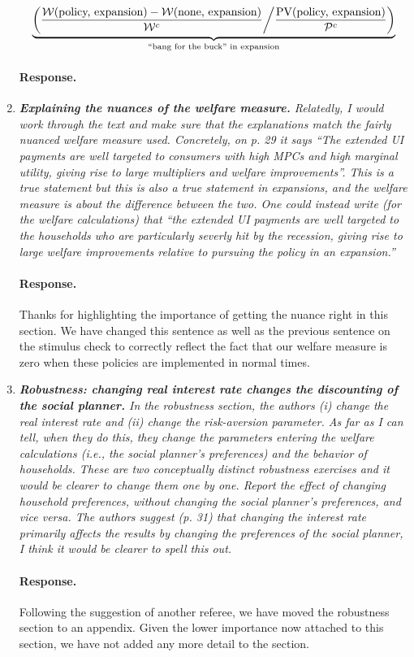 \documentclass[12pt,letterpaper,english]{article}
\begin{document}
\begin{enumerate}
	\[ \underbrace{\left( \frac{\mathcal{W}(\text{policy, expansion}) - \mathcal{W}(\text{none, expansion})}{\mathcal{W}^c} \middle/ \frac{\text{PV}(\text{policy, expansion})}{\mathcal{P}^c} \right)}_{\text{``bang for the buck'' in expansion}} \]

	\paragraph{Response.} 

	\item \textit{\textbf{Explaining the nuances of the welfare measure.} Relatedly, I would work through the text and make sure that the explanations	match the fairly nuanced welfare measure used. Concretely, on p. 29 it says ``The extended UI payments are well targeted to consumers with high MPCs and high marginal utility, giving rise to large multipliers and welfare improvements''. This is a true statement but this is also a true statement in expansions, and the welfare measure is about the difference between the two. One could instead write (for the welfare calculations) that ``the extended UI payments are well targeted to the households who are particularly severly hit by the recession, giving rise to large welfare improvements relative to pursuing the policy in an expansion.''} 
	
	\paragraph{Response.} Thanks for highlighting the importance of getting the nuance right in this section. We have changed this sentence as well as the previous sentence on the stimulus check to correctly reflect the fact that our welfare measure is zero when these policies are implemented in normal times.

	\item \textit{\textbf{Robustness: changing real interest rate changes the discounting of the social planner.} In the robustness section, the authors (i) change the real interest rate and (ii) change the risk-aversion parameter. As far as I can tell, when they do this, they change the parameters entering the welfare calculations (i.e., the social planner’s preferences) and the behavior of households. These are two conceptually distinct robustness exercises and it would be clearer to change them one by one. Report the effect of changing household preferences, without changing the social planner’s preferences, and vice versa. The authors suggest (p. 31) that		changing the interest rate primarily affects the results by changing the preferences of the social planner, I think it would be clearer to spell	this out.}
	
	\paragraph{Response.} Following the suggestion of another referee, we have moved the robustness section to an appendix. Given the lower importance now attached to this section, we have not added any more detail to the section.

\end{enumerate}
	
\end{document}
